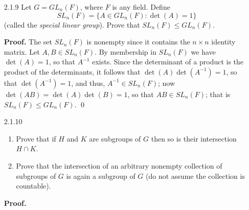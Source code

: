 \begin{enumerate}
      \textbf{Proof.} Suppose first that $H \cup K \le G$. Now assume to the
      contrary that neither $H$ nor $K$ is a subset of the other. Thus there
      exist $h \in H$ and $k \in K$ such that $h \notin K$ and $k \notin H$.
      Since $h, k \in H \cup K$ and $H \cup K$ is a group, it follows that
      $hk \in H \cup K$. Assume without loss that $hk \in H$. Then it follows
      that $k = (h^{-1})hk \in H$, a contradiction. Thus we must have that
      either $H \subseteq K$ or $K \subseteq H$. The converse of the proof is 
      trivial. \qed
   \item[2.1.9]   Let $G = GL_n(F)$, where $F$ is any field. Define
                  $$SL_n(F) = \{A \in GL_n(F) : \det(A) = 1\}$$
                  (called the \textit{special linear group}). Prove that
                  $SL_n(F) \le GL_n(F)$.

      \textbf{Proof.} The set $SL_n(F)$ is nonempty since it contains the
      $n \times n$ identity matrix. Let $A, B \in SL_n(F)$. By membership in
      $SL_n(F)$ we have $\det(A) = 1$, so that $A^{-1}$ exists. Since the
      determinant of a product is the product of the determinants, it follows
      that $\det(A)\det(A^{-1}) = 1$, so that $\det(A^{-1}) = 1$, and thus,
      $A^{-1} \in SL_n(F)$; now $\det(AB) = \det(A)\det(B) = 1$, so that
      $AB \in SL_n(F)$; that is $SL_n(F) \le GL_n(F)$. \qed
   \item[2.1.10]  \begin{enumerate}
                     \item Prove that if $H$ and $K$ are subgroups of $G$ then
                           so is their intersection $H \cap K$.
                     \item Prove that the intersection of an arbitrary nonempty
                           collection of subgroups of $G$ is again a subgroup of
                           $G$ (do not assume the collection is countable).
                  \end{enumerate}

      \textbf{Proof.}


\end{enumerate}
